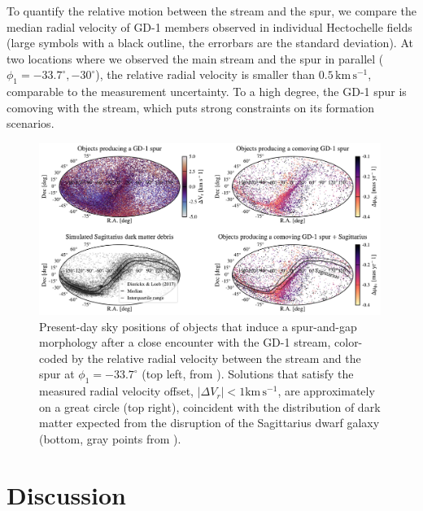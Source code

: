 \documentclass[twocolumn]{aastex63}
\newcommand{\kms}{\ensuremath{\textrm{km}\,\textrm{s}^{-1}}}
\begin{document}
To quantify the relative motion between the stream and the spur, we compare the median radial velocity of GD-1 members observed in individual Hectochelle fields (large symbols with a black outline, the errorbars are the standard deviation).
At two locations where we observed the main stream and the spur in parallel ($\phi_1=-33.7^\circ, -30^\circ$), the relative radial velocity is smaller than $0.5\,\kms$, comparable to the measurement uncertainty.
To a high degree, the GD-1 spur is comoving with the stream, which puts strong constraints on its formation scenarios.


\begin{figure}
\begin{center}
\includegraphics[width=0.99\textwidth]{skybox.pdf}
\end{center}
\caption{Present-day sky positions of objects that induce a spur-and-gap morphology after a close encounter with the GD-1 stream, color-coded by the relative radial velocity between the stream and the spur at $\phi_1=-33.7^\circ$ (top left, from \citealt{bonaca2019a}).
Solutions that satisfy the measured radial velocity offset, $|\Delta V_r|<1\kms$, are approximately on a great circle (top right), coincident with the distribution of dark matter expected from the disruption of the Sagittarius dwarf galaxy (bottom, gray points from \citealt{dl2017}).
}
\label{fig:skybox}
\end{figure}

\section{Discussion}
\label{sec:discussion}
\end{document}
